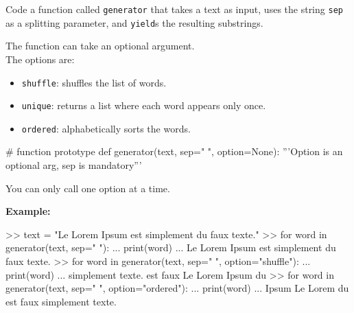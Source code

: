 \documentclass[]{article}
\newenvironment{Shaded}{\begin{snugshade}}{\end{snugshade}}
\newcommand{\BuiltInTok}[1]{\textcolor[rgb]{0.50,0.55,0.55}{#1}}
\newcommand{\CommentTok}[1]{\textcolor[rgb]{0.48,0.49,0.49}{#1}}
\newcommand{\ControlFlowTok}[1]{\textcolor[rgb]{0.99,0.74,0.29}{#1}}
\newcommand{\KeywordTok}[1]{\textcolor[rgb]{0.81,0.81,0.76}{#1}}
\newcommand{\NormalTok}[1]{\textcolor[rgb]{0.81,0.81,0.76}{#1}}
\newcommand{\OperatorTok}[1]{\textcolor[rgb]{0.81,0.81,0.76}{#1}}
\newcommand{\StringTok}[1]{\textcolor[rgb]{0.96,0.31,0.31}{#1}}
\newcommand{\VariableTok}[1]{\textcolor[rgb]{0.15,0.68,0.68}{#1}}
\begin{document}
Code a function called \texttt{generator} that takes a text as input,
uses the string \texttt{sep} as a splitting parameter, and
\texttt{yield}s the resulting substrings.

The function can take an optional argument.\\
The options are:

\begin{itemize}
\item
  \texttt{shuffle}: shuffles the list of words.
\item
  \texttt{unique}: returns a list where each word appears only once.
\item
  \texttt{ordered}: alphabetically sorts the words.
\end{itemize}

\begin{Shaded}
\begin{Highlighting}[]
\CommentTok{# function prototype}
\KeywordTok{def}\NormalTok{ generator(text, sep}\OperatorTok{=}\StringTok{" "}\NormalTok{, option}\OperatorTok{=}\VariableTok{None}\NormalTok{):}
    \CommentTok{'''Option is an optional arg, sep is mandatory'''}
\end{Highlighting}
\end{Shaded}

You can only call one option at a time.

\textbf{Example:}

\begin{Shaded}
\begin{Highlighting}[]
\OperatorTok{>>}\NormalTok{ text }\OperatorTok{=} \StringTok{"Le Lorem Ipsum est simplement du faux texte."}
\OperatorTok{>>} \ControlFlowTok{for}\NormalTok{ word }\KeywordTok{in}\NormalTok{ generator(text, sep}\OperatorTok{=}\StringTok{" "}\NormalTok{):}
\NormalTok{...     }\BuiltInTok{print}\NormalTok{(word)}
\NormalTok{...}
\NormalTok{Le}
\NormalTok{Lorem}
\NormalTok{Ipsum}
\NormalTok{est}
\NormalTok{simplement}
\NormalTok{du}
\NormalTok{faux}
\NormalTok{texte.}
\OperatorTok{>>} \ControlFlowTok{for}\NormalTok{ word }\KeywordTok{in}\NormalTok{ generator(text, sep}\OperatorTok{=}\StringTok{" "}\NormalTok{, option}\OperatorTok{=}\StringTok{"shuffle"}\NormalTok{):}
\NormalTok{...     }\BuiltInTok{print}\NormalTok{(word)}
\NormalTok{...}
\NormalTok{simplement}
\NormalTok{texte.}
\NormalTok{est}
\NormalTok{faux}
\NormalTok{Le}
\NormalTok{Lorem}
\NormalTok{Ipsum}
\NormalTok{du}
\OperatorTok{>>} \ControlFlowTok{for}\NormalTok{ word }\KeywordTok{in}\NormalTok{ generator(text, sep}\OperatorTok{=}\StringTok{" "}\NormalTok{, option}\OperatorTok{=}\StringTok{"ordered"}\NormalTok{):}
\NormalTok{...     }\BuiltInTok{print}\NormalTok{(word)}
\NormalTok{...}
\NormalTok{Ipsum}
\NormalTok{Le}
\NormalTok{Lorem}
\NormalTok{du}
\NormalTok{est}
\NormalTok{faux}
\NormalTok{simplement}
\NormalTok{texte.}
\end{Highlighting}
\end{Shaded}
\end{document}
